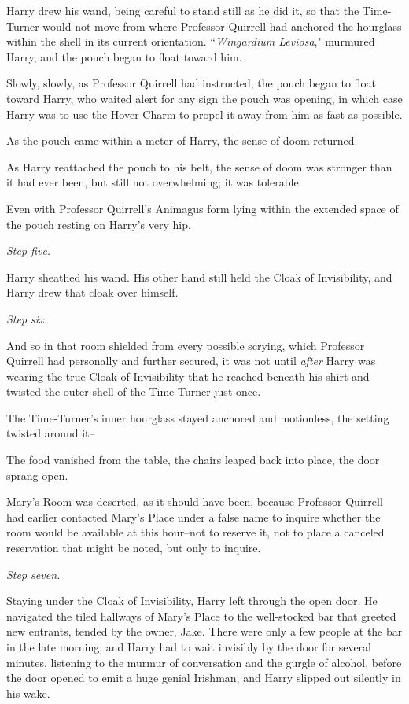Harry drew his wand, being careful to stand still as he did it, so that the Time-Turner would not move from where Professor Quirrell had anchored the hourglass within the shell in its current orientation. ``\emph{Wingardium Leviosa}," murmured Harry, and the pouch began to float toward him.

Slowly, slowly, as Professor Quirrell had instructed, the pouch began to float toward Harry, who waited alert for any sign the pouch was opening, in which case Harry was to use the Hover Charm to propel it away from him as fast as possible.

As the pouch came within a meter of Harry, the sense of doom returned.

As Harry reattached the pouch to his belt, the sense of doom was stronger than it had ever been, but still not overwhelming; it was tolerable.

Even with Professor Quirrell's Animagus form lying within the extended space of the pouch resting on Harry's very hip.

\emph{Step five.}

Harry sheathed his wand. His other hand still held the Cloak of Invisibility, and Harry drew that cloak over himself.

\emph{Step six.}

And so in that room shielded from every possible scrying, which Professor Quirrell had personally and further secured, it was not until \emph{after} Harry was wearing the true Cloak of Invisibility that he reached beneath his shirt and twisted the outer shell of the Time-Turner just once.

The Time-Turner's inner hourglass stayed anchored and motionless, the setting twisted around it\---

The food vanished from the table, the chairs leaped back into place, the door sprang open.

Mary's Room was deserted, as it should have been, because Professor Quirrell had earlier contacted Mary's Place under a false name to inquire whether the room would be available at this hour\---not to reserve it, not to place a canceled reservation that might be noted, but only to inquire.

\emph{Step seven.}

Staying under the Cloak of Invisibility, Harry left through the open door. He navigated the tiled hallways of Mary's Place to the well-stocked bar that greeted new entrants, tended by the owner, Jake. There were only a few people at the bar in the late morning, and Harry had to wait invisibly by the door for several minutes, listening to the murmur of conversation and the gurgle of alcohol, before the door opened to emit a huge genial Irishman, and Harry slipped out silently in his wake.

